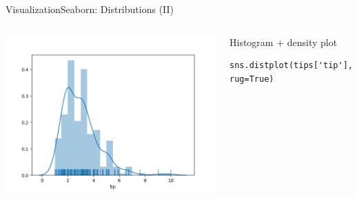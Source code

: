 \documentclass[10pt,compress]{beamer} %
\begin{document}
\begin{frame}[fragile]{Visualization}{Seaborn: Distributions (II)}
	\begin{columns}[t]
	\includegraphics[width=\textwidth]{figs/sns-histogram3.png}\\

	\begin{exampleblock}{\footnotesize{Histogram + density plot}}
	\vspace{-0.2cm} 
	\begin{lstlisting}[basicstyle=\small]
	sns.distplot(tips['tip'], rug=True)
	\end{lstlisting}
	\vspace{-0.2cm} 
	\end{exampleblock}


\end{columns}
\end{frame}
\end{document}
